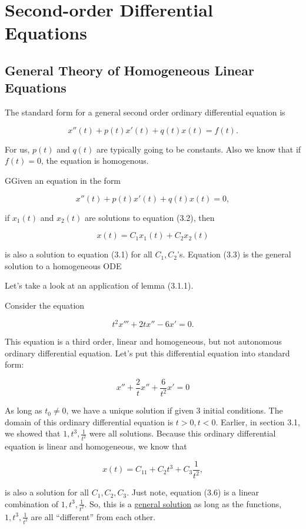 \section{Second-order Differential Equations}

\subsection{General Theory of Homogeneous Linear Equations}
  The standard form for a general second order ordinary differential equation is

  \[
    x''(t)+p(t)x'(t)+q(t)x(t)=f(t).
  \]
  
  For us, $p(t)$ and $q(t)$ are typically going to be constants. Also we know that if $f(t)=0$, the equation is homogenous.

  \begin{lemma}
    GGiven an equation in the form 

    \[
      x''(t)+p(t)x'(t)+q(t)x(t)=0,
    \]

    if $x_1(t)$ and $x_2(t)$ are solutions to equation (3.2), then 
    \[\]

    \[
      x(t)=C_1x_1(t)+C_2x_2(t)
    \]

    is also a solution to equation (3.1) for all $C_1,C_2$'s. Equation (3.3) is the general solution to a homogeneous ODE
  \end{lemma}

  Let's take a look at an application of lemma (3.1.1).

  \begin{eg}
    Consider the equation

    \[
    t^2x'''+2tx''-6x'=0.
    \]

    This equation is a third order, linear and homogeneous, but not autonomous ordinary differential equation. Let's put this differential equation into standard form:

    \[
    x''+\frac{2}{t}x''+\frac{6}{t^2}x'=0
    \]

    As long as $t_0\neq0$, we have a unique solution if given 3 initial conditions. The domain of this ordinary differential equation is $t>0,t<0$. Earlier, in section 3.1, we showed that $1,t^3,\frac{1}{t^2}$ were all solutions. Because this ordinary differential equation is linear and homogeneous, we know that 

    \[
    x(t)=C_11+C_2t^3+C_3\frac{1}{t^2},
    \]

    is also a solution for all $C_1,C_2,C_3$. Just note, equation (3.6) is a linear combination of $1,t^3,\frac{1}{t^2}$. So, this is a \underline{general solution} as long as the functions, $1,t^3,\frac{1}{t^2}$ are all “different” from each other.
  \end{eg}

